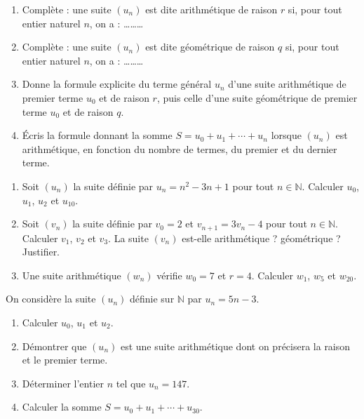 \documentclass[11pt]{article}
\newcommand{\cle}[1]{{\popxbold\color{popdark}#1}}
\newcounter{popsec}
\newcounter{popsub}
\newcommand{\courssub}[1]{%
  \stepcounter{popsub}%
  \par\vspace{9pt}\noindent{\popxbold\fontsize{11.5}{13}\selectfont\color{popink}{\color{poporange}\thepopsec.\thepopsub}\hspace{6pt}#1}\par\nopagebreak\vspace{4pt}
}
\begin{document}
\begin{exercice}
\begin{enumerate}
\item Complète : une suite $(u_n)$ est dite \cle{arithmétique} de raison $r$ si, pour tout entier naturel $n$, on a : \ldots\ldots\ldots
\item Complète : une suite $(u_n)$ est dite \cle{géométrique} de raison $q$ si, pour tout entier naturel $n$, on a : \ldots\ldots\ldots
\item Donne la formule explicite du terme général $u_n$ d'une suite arithmétique de premier terme $u_0$ et de raison $r$, puis celle d'une suite géométrique de premier terme $u_0$ et de raison $q$.
\item Écris la formule donnant la somme $S = u_0 + u_1 + \cdots + u_n$ lorsque $(u_n)$ est arithmétique, en fonction du nombre de termes, du premier et du dernier terme.
\end{enumerate}
\end{exercice}

\begin{exercice}
\begin{enumerate}
\item Soit $(u_n)$ la suite définie par $u_n = n^2 - 3n + 1$ pour tout $n \in \mathbb{N}$. Calculer $u_0$, $u_1$, $u_2$ et $u_{10}$.
\item Soit $(v_n)$ la suite définie par $v_0 = 2$ et $v_{n+1} = 3v_n - 4$ pour tout $n \in \mathbb{N}$. Calculer $v_1$, $v_2$ et $v_3$. La suite $(v_n)$ est-elle arithmétique ? géométrique ? Justifier.
\item Une suite arithmétique $(w_n)$ vérifie $w_0 = 7$ et $r = 4$. Calculer $w_1$, $w_5$ et $w_{20}$.
\end{enumerate}
\end{exercice}

\courssub{Je m'entraîne}

\begin{exercice}
On considère la suite $(u_n)$ définie sur $\mathbb{N}$ par $u_n = 5n - 3$.
\begin{enumerate}
\item Calculer $u_0$, $u_1$ et $u_2$.
\item Démontrer que $(u_n)$ est une suite arithmétique dont on précisera la raison et le premier terme.
\item Déterminer l'entier $n$ tel que $u_n = 147$.
\item Calculer la somme $S = u_0 + u_1 + \cdots + u_{30}$.
\end{enumerate}
\end{exercice}
\end{document}
